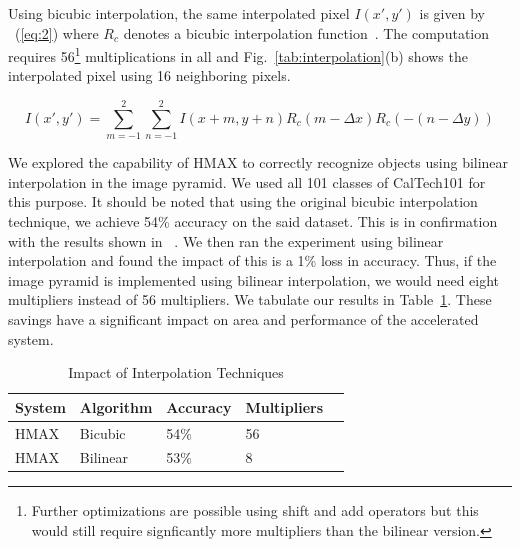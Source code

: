Using bicubic interpolation, the same interpolated pixel $I(x',y')$ is given by ~(\ref{eq:2}) where 
$R_c$ denotes a bicubic interpolation function~\cite{Keys}. The computation requires 56\footnote{Further optimizations are possible using shift and add operators but this would still require signficantly more multipliers than the bilinear version.} multiplications in all and Fig.~\ref{tab:interpolation}(b) shows the interpolated pixel 
using 16 neighboring pixels.

{
\begin{equation}
I(x',y')=\sum_{m=-1}^{2}\sum_{n=-1}^{2}I(x+m,y+n)R_c(m-\Delta x)R_c(-(n-\Delta y))
\label{eq:2}
\end{equation}
}

We explored the capability of HMAX to correctly recognize objects using bilinear interpolation in the image pyramid. We used all 101 classes of CalTech101 
for this purpose. It should be noted that using the original bicubic interpolation technique, we achieve 54\% accuracy on the said dataset. This is in confirmation with the results shown in ~\cite{Mutch2008}. 
We then ran the experiment using bilinear interpolation and found the impact of this is a 1\% loss in accuracy. Thus, if the image pyramid is implemented 
using bilinear interpolation, we would need eight multipliers instead of 
56 multipliers. We tabulate our results in Table~\ref{table:compute}. These savings have a significant impact on area and performance of the accelerated system. 

\begin{table}[h]
\renewcommand{\arraystretch}{1.3}
\caption {Impact of Interpolation Techniques}
\label{table:compute}
\centering
\begin{tabular}{lllll}
 System & Algorithm & Accuracy & Multipliers\\\hline
 HMAX	& Bicubic   & 54\% & 56\\\hline
 HMAX   & Bilinear  & 53\% & 8\\\hline
\end{tabular}
\end{table}
